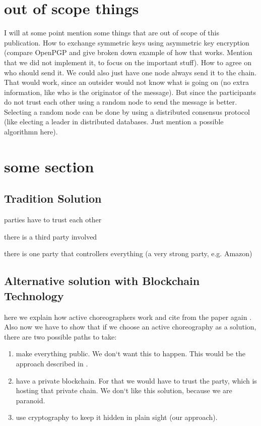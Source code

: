 \documentclass[runningheads]{llncs}
\begin{document}
\section{out of scope things}
I will at some point mention some things that are out of scope of this publication. How to exchange symmetric keys using asymmetric key encryption (compare OpenPGP and give broken down example of how that works. Mention that we did not implement it, to focus on the important stuff). How to agree on who should send it. We could also just have one node always send it to the chain. That would work, since an outsider would not know what is going on (no extra information, like who is the originator of the message). But since the participants do not trust each other using a random node to send the message is better. Selecting a random node can be done by using a distributed consensus protocol (like electing a leader in distributed databases. Just mention a possible algorithmn here).   



\section{some section}


\subsection{Tradition Solution}
parties have to trust each other 

there is a third party involved

there is one party that controllers everything (a very strong party, e.g. Amazon)


\subsection{Alternative solution with Blockchain Technology}
here we explain how active choreographers work and cite from the paper again \cite{weber2016untrusted}. Also now we have to show that if we choose an active choreography as a solution, there are two possible paths to take: 

\begin{enumerate}
    \item make everything public. We don`t want this to happen. This would be the approach described in \cite{weber2016untrusted}.
    \item have a private blockchain. For that we would have to trust the party, which is hosting that private chain. We don`t like this solution, because we are paranoid. 
    \item use cryptography to keep it hidden in plain sight (our approach).
\end{enumerate}
\end{document}
